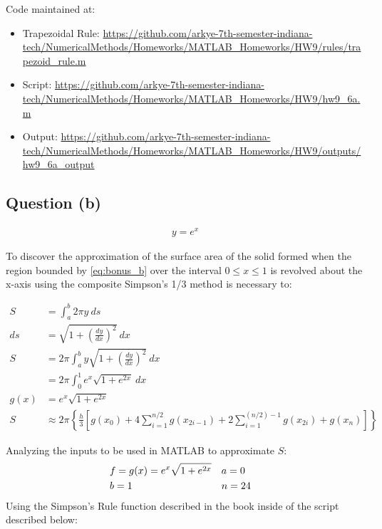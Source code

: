 		Code maintained at:
		\begin{itemize}
			\item{Trapezoidal Rule: \url{https://github.com/arkye-7th-semester-indiana-tech/NumericalMethods/Homeworks/MATLAB_Homeworks/HW9/rules/trapezoid_rule.m}}
			\item{Script: \url{https://github.com/arkye-7th-semester-indiana-tech/NumericalMethods/Homeworks/MATLAB_Homeworks/HW9/hw9_6a.m}}
			\item{Output: \url{https://github.com/arkye-7th-semester-indiana-tech/NumericalMethods/Homeworks/MATLAB_Homeworks/HW9/outputs/hw9_6a_output}}
		\end{itemize}

	\subsection{Question (b)}
		\begin{align}
			y = e^{x} \label{eq:bonus_b}
		\end{align}

		To discover the approximation of the surface area of the solid formed when the region bounded by \cref{eq:bonus_b} over the interval $0 \leq x \leq 1$ is revolved about the x-axis using the composite Simpson's 1/3 method is necessary to:

		\begin{align}
			S &= \int_{a}^{b} 2\pi y \ ds& \\
			ds &= \sqrt{1 + \left(\frac{dy}{dx}\right)^{2}} \ dx& \\
			S &= 2\pi \int_{a}^{b} y \sqrt{1 + \left(\frac{dy}{dx}\right)^{2}} \ dx \\
			&= 2\pi \int_{0}^{1} e^{x} \sqrt{1 + e^{2x}} \ dx \\
			g(x) &= e^{x} \sqrt{1 + e^{2x}}& \\
			S &\approx 2\pi \left\{ \frac{h}{3}\left[
			g(x_{0})+
			4 \sum_{i=1}^{n/2} g(x_{2i-1}) +
			2 \sum_{i=1}^{(n/2)-1} g(x_{2i}) +
			g(x_{n})
			\right]\right\}&
		\end{align}

		Analyzing the inputs to be used in MATLAB to approximate $S$:
		\begin{align}
			&f = g(x) = e^{x} \sqrt{1 + e^{2x}}& &a = 0& \notag \\
			&b = 1& &n = 24& \notag
		\end{align}
		Using the Simpson's Rule function described in the book  inside of the script described below:
		\\
		\noindent\makebox[\linewidth]{\rule{\paperwidth/2}{0.4pt}}
		
		\noindent\makebox[\linewidth]{\rule{\paperwidth/2}{0.4pt}}

